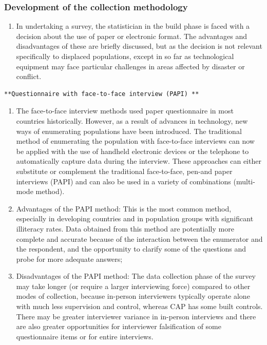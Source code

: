 \documentclass[
]{article}
\providecommand{\tightlist}{%
  \setlength{\itemsep}{0pt}\setlength{\parskip}{0pt}}
\begin{document}
\hypertarget{development-of-the-collection-methodology}{%
\subsubsection{Development of the collection methodology}\label{development-of-the-collection-methodology}}

\begin{enumerate}
\def\labelenumi{\arabic{enumi}.}
\setcounter{enumi}{297}
\tightlist
\item
  In undertaking a survey, the statistician in the build phase is
  faced with a decision about the use of paper or electronic format.
  The advantages and disadvantages of these are briefly discussed, but
  as the decision is not relevant specifically to displaced
  populations, except in so far as technological equipment may face
  particular challenges in areas affected by disaster or conflict.
\end{enumerate}

\begin{verbatim}
**Questionnaire with face-to-face interview (PAPI) **
\end{verbatim}

\begin{enumerate}
\def\labelenumi{\arabic{enumi}.}
\setcounter{enumi}{298}
\item
  The face-to-face interview methods used paper questionnaire in most
  countries historically. However, as a result of advances in
  technology, new ways of enumerating populations have been
  introduced. The traditional method of enumerating the population
  with face-to-face interviews can now be applied with the use of
  handheld electronic devices or the telephone to automatically
  capture data during the interview. These approaches can either
  substitute or complement the traditional face-to-face, pen-and paper
  interviews (PAPI) and can also be used in a variety of combinations
  (multi-mode method).
\item
  Advantages of the PAPI method: This is the most common method,
  especially in developing countries and in population groups with
  significant illiteracy rates. Data obtained from this method are
  potentially more complete and accurate because of the interaction
  between the enumerator and the respondent, and the opportunity to
  clarify some of the questions and probe for more adequate answers;
\item
  Disadvantages of the PAPI method: The data collection phase of the
  survey may take longer (or require a larger interviewing force)
  compared to other modes of collection, because in-person
  interviewers typically operate alone with much less supervision and
  control, whereas CAP has some built controls. There may be greater
  interviewer variance in in-person interviews and there are also
  greater opportunities for interviewer falsification of some
  questionnaire items or for entire interviews.
\end{enumerate}
\end{document}
